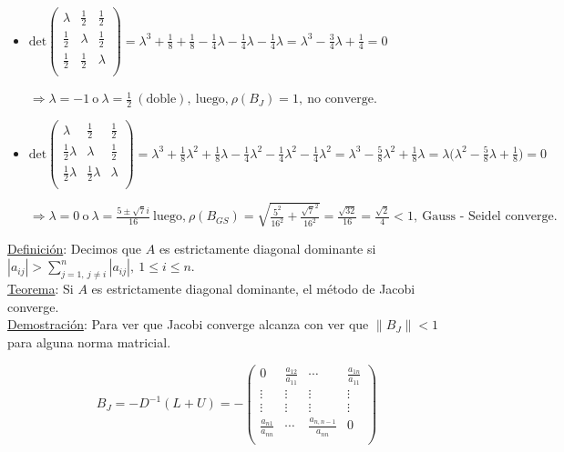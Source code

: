 \begin{itemize}
	\item $\text{det}
	\begin{pmatrix}
        \lambda & \frac{1}{2} & \frac{1}{2}\\
		\frac{1}{2} & \lambda & \frac{1}{2}\\
		\frac{1}{2} & \frac{1}{2} & \lambda\\        
	\end{pmatrix}
	= \lambda^{3} + \frac{1}{8} + \frac{1}{8} - \frac{1}{4}\lambda - \frac{1}{4}\lambda - \frac{1}{4}\lambda = \lambda^{3} - \frac{3}{4}\lambda + \frac{1}{4} = 0$
	
	$ \Rightarrow \lambda = -1\ \text{o}\ \lambda = \frac{1}{2}\ (\text{doble}),\ \text{luego,}\ \rho(B_{J}) = 1,\ \text{no converge.}$
	
	\item $\text{det}
	\begin{pmatrix}
        \lambda & \frac{1}{2} & \frac{1}{2}\\
		\frac{1}{2}\lambda & \lambda & \frac{1}{2}\\
		\frac{1}{2}\lambda & \frac{1}{2}\lambda & \lambda\\        
	\end{pmatrix}
	= \lambda^{3} + \frac{1}{8}\lambda^{2} + \frac{1}{8}\lambda - \frac{1}{4}\lambda^{2} - \frac{1}{4}\lambda^{2} - \frac{1}{4}\lambda^{2} = \lambda^{3} - \frac{5}{8}\lambda^{2} + \frac{1}{8}\lambda = \lambda\bigg(\lambda^{2} - \frac{5}{8}\lambda + \frac{1}{8} \bigg)= 0$
	
	$ \Rightarrow \lambda = 0\ \text{o}\ \lambda = \frac{5 \pm \sqrt{7}i}{16}\ \text{luego,}\ \rho(B_{GS}) = \sqrt{\frac{5^{2}}{16^{2}} + \frac{\sqrt{7}^{2}}{16^{2}}} = \frac{\sqrt{32}}{16} = \frac{\sqrt{2}}{4} < 1,\ \text{Gauss - Seidel converge.}$\\
\end{itemize}

\underline{Definici\'on}: Decimos que $A$ es estrictamente diagonal dominante si $|a_{ij}| > \sum \limits_{j = 1,\ j \neq i}^{n} |a_{ij}|,\ 1 \leq i \leq n$.\\

\underline{Teorema}: Si $A$ es estrictamente diagonal dominante, el m\'etodo de Jacobi converge.\\

\underline{Demostraci\'on}: Para ver que Jacobi converge alcanza con ver que $\|B_{J}\| < 1$ para alguna norma matricial.

$$B_{J} = -D^{-1}(L + U) = -
	\begin{pmatrix}
        0 & \frac{a_{12}}{a_{11}} & \cdots & \frac{a_{1n}}{a_{11}}\\
		\vdots & \vdots & \vdots & \vdots\\
		\vdots & \vdots & \vdots & \vdots\\
		\frac{a_{n1}}{a_{nn}} & \cdots & \frac{a_{n, n - 1}}{a_{nn}} & 0\\
	\end{pmatrix}
$$

